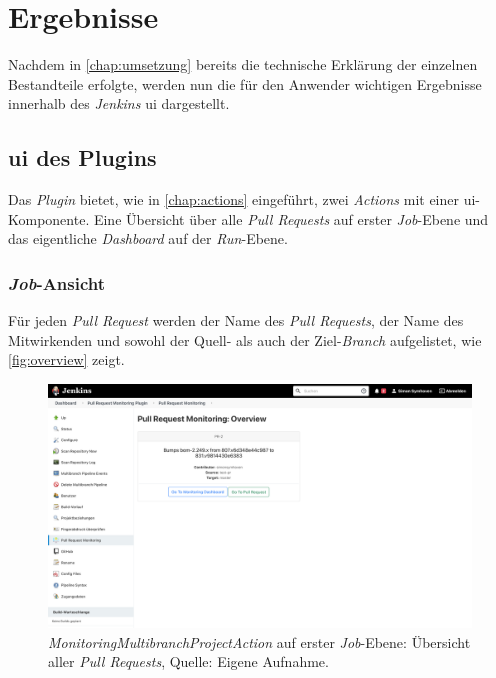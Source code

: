 \chapter{Ergebnisse}
\label{chap:ergebnisse}

Nachdem in \autoref{chap:umsetzung} bereits die technische Erklärung der einzelnen Bestandteile erfolgte, werden nun die für den Anwender wichtigen Ergebnisse innerhalb des \textit{Jenkins} \ac{ui} dargestellt.

\section{\acl{ui} des Plugins} 

Das \textit{Plugin} bietet, wie in \autoref{chap:actions} eingeführt, zwei \textit{Actions} mit einer \ac{ui}-Komponente. Eine Übersicht über alle \textit{Pull Requests} auf erster \textit{Job}-Ebene und das eigentliche \textit{Dashboard} auf der \textit{Run}-Ebene.

\subsection{\textit{Job}-Ansicht}
\label{chap:job-result}

Für jeden \textit{Pull Request} werden der Name des \textit{Pull Requests}, der Name des Mitwirkenden und sowohl der Quell- als auch der Ziel-\textit{Branch} aufgelistet, wie \autoref{fig:overview} zeigt. 

\begin{figure}[h!]
\centering
\includegraphics[width=\textwidth]{source/images/overview}
\caption[\textit{MonitoringMultibranchProjectAction} auf erster \textit{Job}-Ebene: Übersicht aller \textit{Pull Requests}.]{\textit{MonitoringMultibranchProjectAction} auf erster \textit{Job}-Ebene: Übersicht aller \textit{Pull Requests}, Quelle: Eigene Aufnahme.}
\label{fig:overview}
\end{figure}

